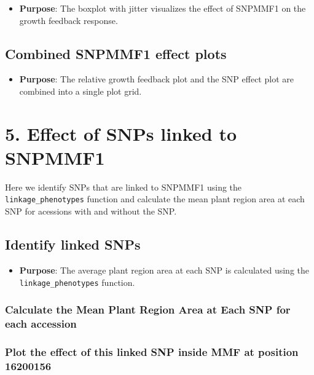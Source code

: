 \documentclass[
  11pt,
]{article}
\providecommand{\tightlist}{%
  \setlength{\itemsep}{0pt}\setlength{\parskip}{0pt}}\usepackage{longtable,booktabs,array}
\begin{document}
\begin{itemize}
\tightlist
\item
  \textbf{Purpose}: The boxplot with jitter visualizes the effect of
  SNPMMF1 on the growth feedback response.
\end{itemize}

\subsection{Combined SNPMMF1 effect
plots}\label{combined-snpmmf1-effect-plots}

\begin{itemize}
\tightlist
\item
  \textbf{Purpose}: The relative growth feedback plot and the SNP effect
  plot are combined into a single plot grid.
\end{itemize}

\section{\texorpdfstring{\textbf{5. Effect of SNPs linked to
SNPMMF1}}{5. Effect of SNPs linked to SNPMMF1}}\label{effect-of-snps-linked-to-snpmmf1}

Here we identify SNPs that are linked to SNPMMF1 using the
\texttt{linkage\_phenotypes} function and calculate the mean plant
region area at each SNP for acessions with and without the SNP.

\subsection{Identify linked SNPs}\label{identify-linked-snps}

\begin{itemize}
\tightlist
\item
  \textbf{Purpose}: The average plant region area at each SNP is
  calculated using the \texttt{linkage\_phenotypes} function.
\end{itemize}

\subsubsection{Calculate the Mean Plant Region Area at Each SNP for each
accession}\label{calculate-the-mean-plant-region-area-at-each-snp-for-each-accession}

\subsubsection{Plot the effect of this linked SNP inside MMF at position
16200156}\label{plot-the-effect-of-this-linked-snp-inside-mmf-at-position-16200156}
\end{document}
